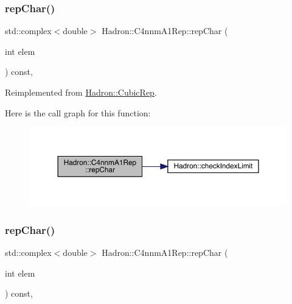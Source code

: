 \subsubsection{\texorpdfstring{repChar()}{repChar()}\hspace{0.1cm}{\footnotesize\ttfamily [2/3]}}
{\footnotesize\ttfamily std\+::complex$<$double$>$ Hadron\+::\+C4nnm\+A1\+Rep\+::rep\+Char (\begin{DoxyParamCaption}\item[{int}]{elem }\end{DoxyParamCaption}) const\hspace{0.3cm}{\ttfamily [inline]}, {\ttfamily [virtual]}}



Reimplemented from \mbox{\hyperlink{structHadron_1_1CubicRep_af45227106e8e715e84b0af69cd3b36f8}{Hadron\+::\+Cubic\+Rep}}.

Here is the call graph for this function\+:
\nopagebreak
\begin{figure}[H]
\begin{center}
\leavevmode
\includegraphics[width=350pt]{d4/dbc/structHadron_1_1C4nnmA1Rep_a369d43e2f70764875daf2967ab976dad_cgraph}
\end{center}
\end{figure}
\mbox{\label{structHadron_1_1C4nnmA1Rep_a369d43e2f70764875daf2967ab976dad}} 
\subsubsection{\texorpdfstring{repChar()}{repChar()}\hspace{0.1cm}{\footnotesize\ttfamily [3/3]}}
{\footnotesize\ttfamily std\+::complex$<$double$>$ Hadron\+::\+C4nnm\+A1\+Rep\+::rep\+Char (\begin{DoxyParamCaption}\item[{int}]{elem }\end{DoxyParamCaption}) const\hspace{0.3cm}{\ttfamily [inline]}, {\ttfamily [virtual]}}



